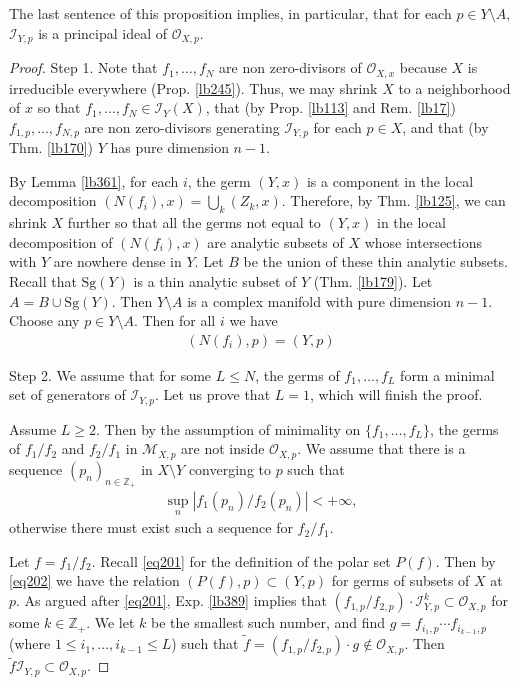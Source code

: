 \documentclass[12pt,b5paper,notitlepage]{report}
\theoremstyle{definition}
\theoremstyle{plain}
\newcommand{\wtd}{\widetilde}
\newcommand{\scr}{\mathscr}
\newcommand{\Zbb}{\mathbb Z}
\newcommand{\Sg}{\mathrm{Sg}}
\numberwithin{equation}{section}
\begin{document}
The last sentence of this proposition implies, in particular, that for each $p\in Y\setminus A$, $\scr I_{Y,p}$ is a principal ideal of $\scr O_{X,p}$.


\begin{proof}
Step 1. Note that $f_1,\dots,f_N$ are non zero-divisors of $\scr O_{X,x}$ because $X$ is irreducible everywhere (Prop. \ref{lb245}). Thus, we may shrink $X$ to a neighborhood of $x$ so that $f_1,\dots,f_N\in\scr I_Y(X)$, that (by Prop. \ref{lb113} and Rem. \ref{lb17}) $f_{1,p},\dots,f_{N,p}$ are non zero-divisors generating $\scr I_{Y,p}$ for each $p\in X$, and that (by Thm. \ref{lb170}) $Y$ has pure dimension $n-1$.

By Lemma \ref{lb361}, for each $i$, the germ $(Y,x)$ is a component in the local  decomposition $(N(f_i),x)=\bigcup_k (Z_k,x)$. Therefore, by Thm. \ref{lb125}, we can shrink $X$ further so that all the germs not equal to $(Y,x)$ in the local decomposition of $(N(f_i),x)$  are analytic subsets of $X$ whose intersections with $Y$ are nowhere dense in $Y$. Let $B$ be the union of these thin analytic subsets. Recall that $\Sg(Y)$ is a thin analytic subset of $Y$ (Thm. \ref{lb179}). Let $A=B\cup\Sg(Y)$. Then $Y\setminus A$ is a complex manifold with pure dimension $n-1$. Choose any $p\in Y\setminus A$. Then for all $i$ we have
\begin{align}
(N(f_i),p)=(Y,p)  \label{eq202}
\end{align}


Step 2. We assume that for some $L\leq N$, the germs of $f_1,\dots,f_L$ form a minimal set of generators of $\scr I_{Y,p}$. Let us prove that $L=1$, which will finish the proof.

Assume $L\geq 2$. Then by the assumption of minimality on $\{f_1,\dots,f_L\}$, the germs of $f_1/f_2$ and $f_2/f_1$ in $\scr M_{X,p}$ are not inside $\scr O_{X,p}$. We assume that there is a sequence $(p_n)_{n\in\Zbb_+}$ in $X\setminus Y$ converging to $p$ such that
\begin{align}
\sup_n|f_1(p_n)/f_2(p_n)|<+\infty,  \label{eq96}
\end{align}
otherwise there must exist such a sequence for $f_2/f_1$.

Let $f=f_1/f_2$. Recall \eqref{eq201} for the definition of the polar set $P(f)$. Then by \eqref{eq202} we have the relation $(P(f),p)\subset (Y,p)$ for germs of subsets of $X$ at $p$. As argued after \eqref{eq201}, Exp. \ref{lb389} implies that $(f_{1,p}/f_{2,p})\cdot\scr I_{Y,p}^k\subset\scr O_{X,p}$ for some $k\in\Zbb_+$. We let $k$ be the smallest such number, and find $g=f_{i_1,p}\cdots f_{i_{k-1},p}$ (where $1\leq i_1,\dots,i_{k-1}\leq L$) such that $\wtd f=(f_{1,p}/f_{2,p})\cdot g\notin\scr O_{X,p}$. Then $\wtd f\scr I_{Y,p}\subset\scr O_{X,p}$.


\end{proof}
\end{document}
